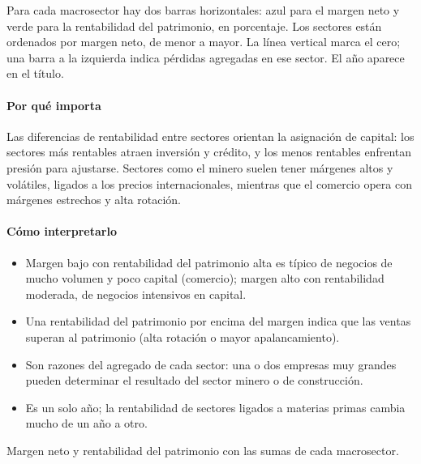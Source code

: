 \begin{leer}
Para cada macrosector hay dos barras horizontales: azul para el margen neto y verde para la rentabilidad del patrimonio, en porcentaje. Los sectores están ordenados por margen neto, de menor a mayor. La línea vertical marca el cero; una barra a la izquierda indica pérdidas agregadas en ese sector. El año aparece en el título.
\end{leer}

\paragraph{Por qué importa}
Las diferencias de rentabilidad entre sectores orientan la asignación de capital: los sectores más rentables atraen inversión y crédito, y los menos rentables enfrentan presión para ajustarse. Sectores como el minero suelen tener márgenes altos y volátiles, ligados a los precios internacionales, mientras que el comercio opera con márgenes estrechos y alta rotación.

\paragraph{Cómo interpretarlo}
\begin{itemize}
\item Margen bajo con rentabilidad del patrimonio alta es típico de negocios de mucho volumen y poco capital (comercio); margen alto con rentabilidad moderada, de negocios intensivos en capital.
\item Una rentabilidad del patrimonio por encima del margen indica que las ventas superan al patrimonio (alta rotación o mayor apalancamiento).
\item Son razones del agregado de cada sector: una o dos empresas muy grandes pueden determinar el resultado del sector minero o de construcción.
\item Es un solo año; la rentabilidad de sectores ligados a materias primas cambia mucho de un año a otro.
\end{itemize}
\begin{formulas}[Fórmulas]
\end{formulas}
\begin{metodo}[Metodología]
Margen neto y rentabilidad del patrimonio con las sumas de cada macrosector.
\par{}
\end{metodo}

